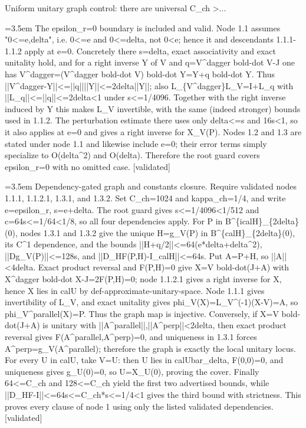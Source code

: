 \documentclass{article}
\newcommand{\step}[1]{\par\noindent\hangindent=3.5em\hangafter=1%
  \makebox[3.5em][l]{\textbf{#1.}}}
\newcommand{\steptag}[1]{\hfill{\small\textsf{[#1]}}}
\begin{document}
\begin{proofbox}{Uniform unitary graph control: there are universal C\_ch >...}
\step{1.4.1.1} The epsilon\_r=0 boundary is included and valid. Node 1.1 assumes "0<=e,delta", i.e. 0<=e and 0<=delta, not 0<e; hence it and descendants 1.1.1-1.1.2 apply at e=0. Concretely there s=delta, exact associativity and exact unitality hold, and for a right inverse Y of V and q=V\textasciicircum{}dagger bold-dot V-J one has V\textasciicircum{}dagger=(V\textasciicircum{}dagger bold-dot V) bold-dot Y=Y+q bold-dot Y. Thus ||V\textasciicircum{}dagger-Y||<=||q||||Y||<=2delta||Y||; also L\_\{V\textasciicircum{}dagger\}L\_V=I+L\_q with ||L\_q||<=||q||<=2delta<1 under s<=1/4096. Together with the right inverse induced by Y this makes L\_V invertible, with the same (indeed stronger) bounds used in 1.1.2. The perturbation estimate there uses only delta<=s and 16s<1, so it also applies at e=0 and gives a right inverse for X\_V(P). Nodes 1.2 and 1.3 are stated under node 1.1 and likewise include e=0; their error terms simply specialize to O(delta\textasciicircum{}2) and O(delta). Therefore the root guard covers epsilon\_r=0 with no omitted case. \steptag{validated} \\[4pt]
\step{1.4.1.2} Dependency-gated graph and constants closure. Require validated nodes 1.1.1, 1.1.2.1, 1.3.1, and 1.3.2. Set C\_ch=1024 and kappa\_ch=1/4, and write e=epsilon\_r, s=e+delta. The root guard gives s<=1/4096<1/512 and c=64s<=1/64<1/8, so all four dependencies apply. For P in B\textasciicircum{}\{icalH\}\_\{2delta\}(0), nodes 1.3.1 and 1.3.2 give the unique H=g\_V(P) in B\textasciicircum{}\{calH\}\_\{2delta\}(0), its C\textasciicircum{}1 dependence, and the bounds ||H+q/2||<=64(e*delta+delta\textasciicircum{}2), ||Dg\_V(P)||<=128s, and ||D\_HF(P,H)-I\_calH||<=64s. Put A=P+H, so ||A||<4delta. Exact product reversal and F(P,H)=0 give X=V bold-dot(J+A) with X\textasciicircum{}dagger bold-dot X-J=2F(P,H)=0; node 1.1.2.1 gives a right inverse for X, hence X lies in calU by def-approximate-unitary-space. Node 1.1.1 gives invertibility of L\_V, and exact unitality gives phi\_V(X)=L\_V\textasciicircum{}(-1)(X-V)=A, so phi\_V\textasciicircum{}parallel(X)=P. Thus the graph map is injective. Conversely, if X=V bold-dot(J+A) is unitary with ||A\textasciicircum{}parallel||,||A\textasciicircum{}perp||<2delta, then exact product reversal gives F(A\textasciicircum{}parallel,A\textasciicircum{}perp)=0, and uniqueness in 1.3.1 forces A\textasciicircum{}perp=g\_V(A\textasciicircum{}parallel); therefore the graph is exactly the local unitary locus. For every U in calU, take V=U: then U lies in calUbar\_delta, F(0,0)=0, and uniqueness gives g\_U(0)=0, so U=X\_U(0), proving the cover. Finally 64<=C\_ch and 128<=C\_ch yield the first two advertised bounds, while ||D\_HF-I||<=64s<=C\_ch*s<=1/4<1 gives the third bound with strictness. This proves every clause of node 1 using only the listed validated dependencies. \steptag{validated} \\[4pt]

\end{proofbox}
\end{document}
